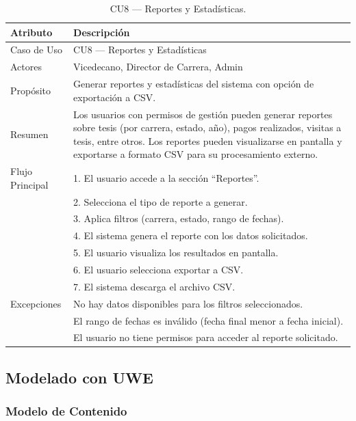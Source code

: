 \begin{table}[H]
\centering
\caption{CU8 — Reportes y Estadísticas.}
\label{tab:cu8}
\begin{tabular}{lp{10cm}}
\toprule
\textbf{Atributo} & \textbf{Descripción} \\
\midrule
Caso de Uso & CU8 — Reportes y Estadísticas \\
Actores & Vicedecano, Director de Carrera, Admin \\
Propósito & Generar reportes y estadísticas del sistema con opción de exportación a CSV. \\
Resumen & Los usuarios con permisos de gestión pueden generar reportes sobre tesis (por carrera, estado, año), pagos realizados, visitas a tesis, entre otros. Los reportes pueden visualizarse en pantalla y exportarse a formato CSV para su procesamiento externo. \\
Flujo Principal & 1. El usuario accede a la sección ``Reportes''. \\
& 2. Selecciona el tipo de reporte a generar. \\
& 3. Aplica filtros (carrera, estado, rango de fechas). \\
& 4. El sistema genera el reporte con los datos solicitados. \\
& 5. El usuario visualiza los resultados en pantalla. \\
& 6. El usuario selecciona exportar a CSV. \\
& 7. El sistema descarga el archivo CSV. \\
Excepciones & No hay datos disponibles para los filtros seleccionados. \\
& El rango de fechas es inválido (fecha final menor a fecha inicial). \\
& El usuario no tiene permisos para acceder al reporte solicitado. \\
\bottomrule
\end{tabular}
\end{table}

\subsection{Modelado con UWE}

\subsubsection{Modelo de Contenido}

